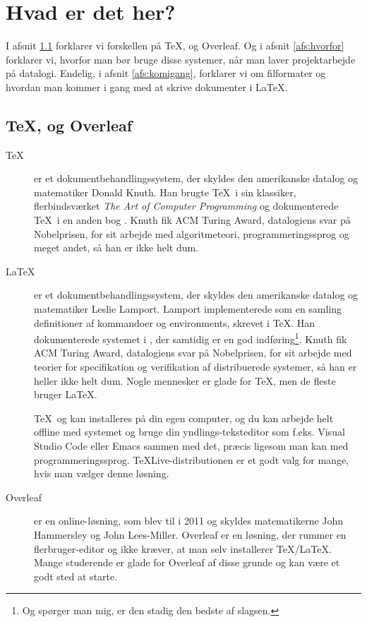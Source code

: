 \chapter{Hvad er det her?}

I afsnit \ref{afs:hvad} forklarer vi forskellen på  \TeX, \latex  og
Overleaf. Og i afsnit \ref{afs:hvorfor} forklarer vi, hvorfor man bør
bruge disse systemer, når man laver projektarbejde på datalogi.
Endelig, i afsnit \ref{afs:komigang}, forklarer vi om filformater og
hvordan man kommer i gang med at skrive dokumenter i \LaTeX.

\section{ \TeX, \latex  og Overleaf} \label{afs:hvad}

\begin{description}
\item[\TeX] er et dokumentbehandlingssystem, der skyldes den
  amerikanske datalog og matematiker Donald Knuth. Han brugte \TeX\ i
  sin klassiker, flerbindsværket \emph{The Art of Computer
    Programming} \cite{knuth1997computer} og dokumenterede \TeX\ i en
  anden bog \cite{Knuth:1996}. Knuth fik ACM Turing Award, datalogiens
  svar på Nobelprisen, for sit arbejde med algoritmeteori,
  programmeringssprog og meget andet, så han er ikke helt dum.
\item[\LaTeX] er et dokumentbehandlingssystem, der skyldes den
  amerikanske datalog og matematiker Leslie Lamport. Lamport
  implementerede \latex  som en samling definitioner af kommandoer og
  environments, skrevet i \TeX. Han dokumenterede systemet i
  \cite{lamport86latex}, der samtidig er en god indføring\footnote{Og
    spørger man mig, er den stadig den bedste af slagsen.}. Knuth fik
  ACM Turing Award, datalogiens svar på Nobelprisen, for sit arbejde
  med teorier for specifikation og verifikation af distribuerede
  systemer, så han er heller ikke helt dum. Nogle mennesker er glade
  for \TeX, men de fleste bruger \LaTeX.

  \TeX\ og \latex  kan installeres på din egen computer, og du kan
  arbejde helt offline med systemet og bruge din yndlings-teksteditor
  som f.eks. Visual Studio Code eller Emacs sammen med det, præcis
  ligesom man kan med programmeringssprog. {\TeX}Live-distributionen
  er et godt valg for mange, hvis man vælger denne løsning.
  
\item[Overleaf] er en online-løsning, som blev til i 2011 og skyldes
  matematikerne John Hammersley og John Lees-Miller. Overleaf er en
  løsning, der rummer en flerbruger-editor og ikke kræver, at man selv
  installerer \TeX/\LaTeX. Mange studerende er glade for Overleaf af
  disse grunde og kan være et godt sted at starte.
\end{description}

